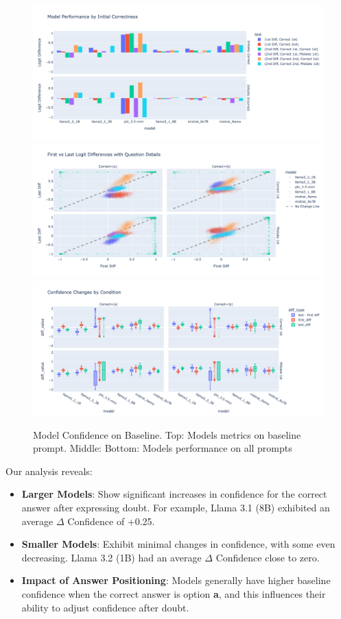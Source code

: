 \begin{figure}[h!]
    \includegraphics[width=\columnwidth]{img/model_confidence_by_initial_correctness_on_baseline.png}
    \includegraphics[width=\columnwidth]{img/first_vs_last_logit_diff_on_baseline.png}
    \includegraphics[width=\columnwidth]{img/confidence_distribution_on_baseline.png}
    \caption{Model Confidence on Baseline. Top: Models metrics on baseline prompt. Middle:  Bottom: Models performance on all prompts} 
    \label{fig:models_confidence}
\end{figure}

Our analysis reveals:

\begin{itemize}
    \item \textbf{Larger Models}: Show significant increases in confidence for the correct answer after expressing doubt. For example, Llama 3.1 (8B) exhibited an average $\Delta$ Confidence of +0.25.
    \item \textbf{Smaller Models}: Exhibit minimal changes in confidence, with some even decreasing. Llama 3.2 (1B) had an average $\Delta$ Confidence close to zero.
    \item \textbf{Impact of Answer Positioning}: Models generally have higher baseline confidence when the correct answer is option \textbf{a}, and this influences their ability to adjust confidence after doubt.
\end{itemize}

